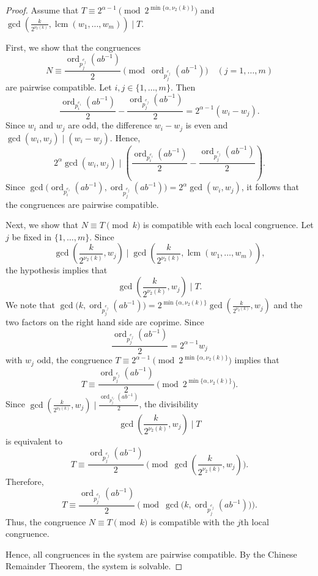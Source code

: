 \documentclass[pdflatex,sn-mathphys-num]{sn-jnl}%
\theoremstyle{thmstyleone}%
\theoremstyle{thmstyletwo}%
\theoremstyle{thmstylethree}%
\newcommand{\ord}{\operatorname{ord}}
\newcommand{\lcm}{\operatorname{lcm}}
\begin{document}
\begin{proof}
Assume that $
T\equiv 2^{\alpha-1}\pmod{2^{\min\{\alpha,\nu_2(k)\}}}
$
and
$
\gcd\left(\frac{k}{2^{\nu_2(k)}},\lcm(w_1,\dots,w_m)\right)\mid T$. 

First, we  show that the  congruences
\[
N\equiv \frac{\ord_{p_j^{e_j}}(ab^{-1})}{2}
\pmod{\ord_{p_j^{e_j}}(ab^{-1})}
\quad (j=1,\dots,m)
\]
are pairwise compatible. Let $i,j\in\{1,\dots,m\}$. Then
\[
\frac{\ord_{p_i^{e_i}}(ab^{-1})}{2}
-
\frac{\ord_{p_j^{e_j}}(ab^{-1})}{2}
=
2^{\alpha-1}(w_i-w_j).
\]
Since $w_i$ and $w_j$ are odd, the difference $w_i-w_j$ is even  and  $
\gcd(w_i,w_j)\mid (w_i-w_j)$.
Hence, 
\[
2^\alpha\gcd(w_i,w_j)
\mid
\left(
\frac{\ord_{p_i^{e_i}}(ab^{-1})}{2}
-
\frac{\ord_{p_j^{e_j}}(ab^{-1})}{2}
\right).
\]
Since 
$
\gcd\bigl(\ord_{p_i^{e_i}}(ab^{-1}),\ord_{p_j^{e_j}}(ab^{-1})\bigr)
=
2^\alpha\gcd(w_i,w_j)$,
it follows that the congruences are pairwise compatible.

Next, we show that
$
N\equiv T\pmod{k}$ 
is compatible with each local congruence. Let $j$ be fixed in  $\{1,\dots,m\}$. Since
\[
\gcd\left(\frac{k}{2^{\nu_2(k)}},w_j\right)
\mid
\gcd\left(\frac{k}{2^{\nu_2(k)}},\lcm(w_1,\dots,w_m)\right),
\]
the hypothesis implies that
\[
\gcd\left(\frac{k}{2^{\nu_2(k)}},w_j\right)\mid T.
\]
We note that 
$
\gcd\bigl(k,\ord_{p_j^{e_j}}(ab^{-1})\bigr)
=
2^{\min\{\alpha,\nu_2(k)\}}
\gcd\left(\frac{k}{2^{\nu_2(k)}},w_j\right)$ 
and the two factors on the right hand side are coprime. Since
\[
\frac{\ord_{p_j^{e_j}}(ab^{-1})}{2}=2^{\alpha-1}w_j
\]
with $w_j$ odd, the congruence $
T\equiv 2^{\alpha-1}\pmod{2^{\min\{\alpha,\nu_2(k)\}}}$
implies that 
\[
T\equiv \frac{\ord_{p_j^{e_j}}(ab^{-1})}{2}
\pmod{2^{\min\{\alpha,\nu_2(k)\}}}.
\]
Since 
$
\gcd\left(\frac{k}{2^{\nu_2(k)}},w_j\right)
\mid
\frac{\ord_{p_j^{e_j}}(ab^{-1})}{2}$,
the divisibility
\[
\gcd\left(\frac{k}{2^{\nu_2(k)}},w_j\right)\mid T
\]
is equivalent to
\[
T\equiv \frac{\ord_{p_j^{e_j}}(ab^{-1})}{2}
\pmod{\gcd\left(\frac{k}{2^{\nu_2(k)}},w_j\right)}.
\]
Therefore,
\[
T\equiv \frac{\ord_{p_j^{e_j}}(ab^{-1})}{2}
\pmod{\gcd\bigl(k,\ord_{p_j^{e_j}}(ab^{-1})\bigr)}.
\]
Thus, the congruence
$
N\equiv T\pmod{k}$
is compatible with the $j$th local congruence.

Hence,  all congruences in the system are pairwise compatible. By the Chinese Remainder Theorem, the system is solvable.
\end{proof}
\end{document}
